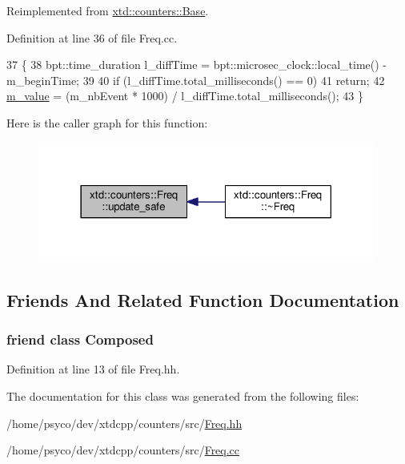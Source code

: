 Reimplemented from \hyperlink{classxtd_1_1counters_1_1Base_a8b3d10c9fb2bea1d240f887bbe4008ea}{xtd\+::counters\+::\+Base}.



Definition at line 36 of file Freq.\+cc.


\begin{DoxyCode}
37 \{
38   bpt::time\_duration l\_diffTime = bpt::microsec\_clock::local\_time() - m\_beginTime;
39 
40   \textcolor{keywordflow}{if} (l\_diffTime.total\_milliseconds() == 0)
41     \textcolor{keywordflow}{return};
42   \hyperlink{classxtd_1_1counters_1_1Value_abe06c1cebededaf2f216707171f63c3c}{m\_value} = (m\_nbEvent * 1000) / l\_diffTime.total\_milliseconds();
43 \}
\end{DoxyCode}


Here is the caller graph for this function\+:
\nopagebreak
\begin{figure}[H]
\begin{center}
\leavevmode
\includegraphics[width=314pt]{classxtd_1_1counters_1_1Freq_af4ee512e594def96c8bd907d2a369729_icgraph}
\end{center}
\end{figure}




\subsection{Friends And Related Function Documentation}
\subsubsection[{\texorpdfstring{Composed}{Composed}}]{\setlength{\rightskip}{0pt plus 5cm}friend class {\bf Composed}\hspace{0.3cm}{\ttfamily [friend]}}\hypertarget{classxtd_1_1counters_1_1Freq_a93e934ad70d5b32b14beed5572450abf}{}\label{classxtd_1_1counters_1_1Freq_a93e934ad70d5b32b14beed5572450abf}


Definition at line 13 of file Freq.\+hh.



The documentation for this class was generated from the following files\+:\begin{DoxyCompactItemize}
\item 
/home/psyco/dev/xtdcpp/counters/src/\hyperlink{Freq_8hh}{Freq.\+hh}\item 
/home/psyco/dev/xtdcpp/counters/src/\hyperlink{Freq_8cc}{Freq.\+cc}\end{DoxyCompactItemize}
